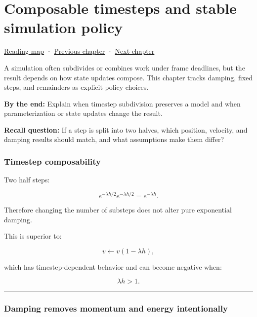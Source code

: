 \chapter{Composable timesteps and stable simulation policy}\label{06-engine-ii-ch039-composable-timesteps-and-stable-simulation-policy}\hypertarget{06-engine-ii-ch039}{}\label{stagechapter:06-engine-ii-ch039}

\hyperref[volume-reading-map]{Reading map} · \hyperref[06-engine-ii-ch038-integrator-choices-and-energy-drift]{Previous chapter} · \hyperref[06-engine-ii-ch040-coupled-contacts-and-iterative-response]{Next chapter}

A simulation often subdivides or combines work under frame deadlines, but the result depends on how state updates compose. This chapter tracks damping, fixed steps, and remainders as explicit policy choices.

\textbf{By the end:} Explain when timestep subdivision preserves a model and when parameterization or state updates change the result.

\textbf{Recall question:} If a step is split into two halves, which position, velocity, and damping results should match, and what assumptions make them differ?

\subsection{Timestep composability}\label{06-engine-ii-ch039-timestep-composability}

Two half steps:

\[
e^{-\lambda h/2}
e^{-\lambda h/2}
=
e^{-\lambda h}.
\]

Therefore changing the number of substeps does not alter pure exponential damping.

This is superior to:

\[
v\leftarrow v(1-\lambda h),
\]

which has timestep-dependent behavior and can become negative when:

\[
\lambda h>1.
\]

\begin{center}\rule{0.5\linewidth}{0.5pt}\end{center}

\subsection{Damping removes momentum and energy intentionally}\label{06-engine-ii-ch039-damping-removes-momentum-and-energy-intentionally}


